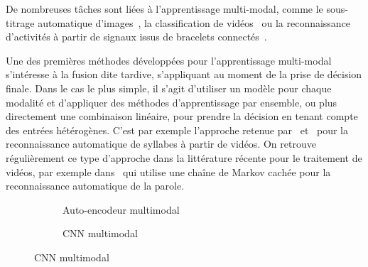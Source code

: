 De nombreuses tâches sont liées à l'apprentissage multi-modal, comme le sous-titrage automatique d'images~\cite{karpathy_deep_2015}, la classification de vidéos~\cite{kim_deep_2013} ou la reconnaissance d'activités à partir de signaux issus de bracelets connectés~\cite{ordonez_deep_2016}.

Une des premières méthodes développées pour l'apprentissage multi-modal s'intéresse à la fusion dite tardive, s'appliquant au moment de la prise de décision finale. Dans le cas le plus simple, il s'agit d'utiliser un modèle pour chaque modalité et d'appliquer des méthodes d'apprentissage par ensemble, ou plus directement une combinaison linéaire, pour prendre la décision en tenant compte des entrées hétérogènes. C'est par exemple l'approche retenue par~\citet{yuhas_integration_1989} et~\citet{meier_adaptive_1996} pour la reconnaissance automatique de syllabes à partir de vidéos. On retrouve régulièrement ce type d'approche dans la littérature récente pour le traitement de vidéos, par exemple dans~\cite{noda_audio-visual_2015} qui utilise une chaîne de Markov cachée pour la reconnaissance automatique de la parole.

\begin{figure}
  \hfill
  \begin{subfigure}[b]{0.43\textwidth}
    \resizebox{\textwidth}{!}{
      
    }
    \caption{Auto-encodeur multimodal~\cite{ngiam_multimodal_2011}}
    \label{fig:ae_multimodal}
  \end{subfigure}%
  \hfill
  \begin{subfigure}[b]{0.53\textwidth}
    \resizebox{\textwidth}{!}{
      
    }
    \caption{\gls{CNN} multimodal~\cite{eitel_multimodal_2015}}
    \label{fig:cnn_multimodal}
  \end{subfigure}
  \hfill
\end{figure}

